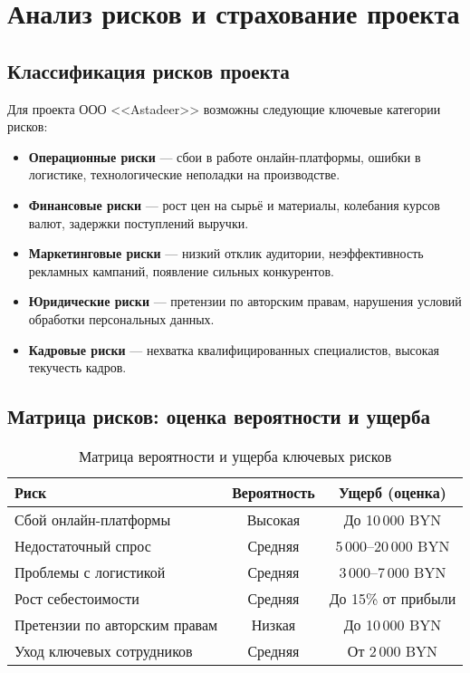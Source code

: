\section{Анализ рисков и страхование проекта}

\subsection{Классификация рисков проекта}

Для проекта ООО <<Astadeer>> возможны следующие ключевые категории рисков:

\begin{itemize}
    \item \textbf{Операционные риски} --- сбои в работе онлайн-платформы, ошибки в логистике, технологические неполадки на производстве.
    \item \textbf{Финансовые риски} --- рост цен на сырьё и материалы, колебания курсов валют, задержки поступлений выручки.
    \item \textbf{Маркетинговые риски} --- низкий отклик аудитории, неэффективность рекламных кампаний, появление сильных конкурентов.
    \item \textbf{Юридические риски} --- претензии по авторским правам, нарушения условий обработки персональных данных.
    \item \textbf{Кадровые риски} --- нехватка квалифицированных специалистов, высокая текучесть кадров.
\end{itemize}

\subsection{Матрица рисков: оценка вероятности и ущерба}

\begin{table}[h]
\centering
\begin{tabular}{|p{6cm}|c|c|}
\hline
\textbf{Риск} & \textbf{Вероятность} & \textbf{Ущерб (оценка)} \\
\hline
Сбой онлайн-платформы & Высокая & До 10\,000 BYN \\
\hline
Недостаточный спрос & Средняя & 5\,000--20\,000 BYN \\
\hline
Проблемы с логистикой & Средняя & 3\,000--7\,000 BYN \\
\hline
Рост себестоимости & Средняя & До 15\% от прибыли \\
\hline
Претензии по авторским правам & Низкая & До 10\,000 BYN \\
\hline
Уход ключевых сотрудников & Средняя & От 2\,000 BYN \\
\hline
\end{tabular}
\caption{Матрица вероятности и ущерба ключевых рисков}
\end{table}


